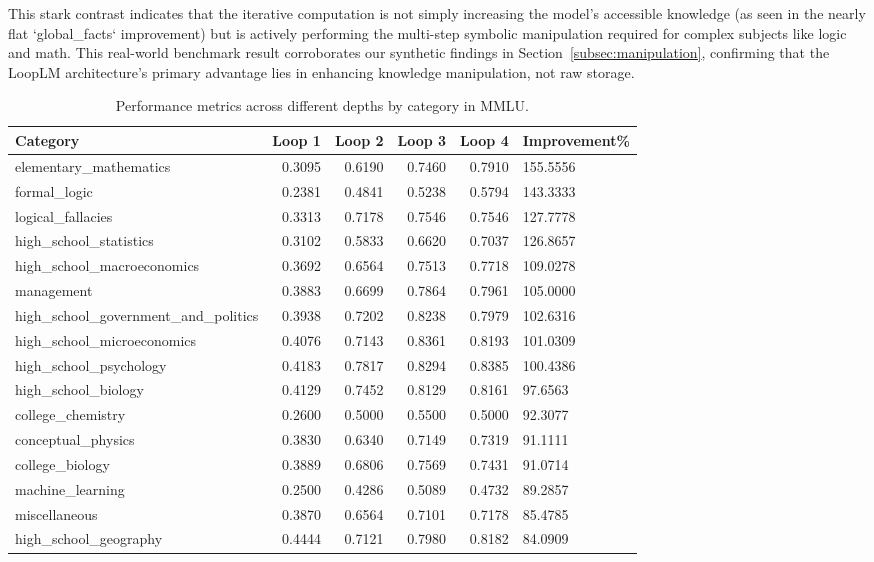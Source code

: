 \documentclass[]{bytedance_seed}
\newcommand{\1}{\mathbf{1}}
\newcommand{\ut}{LoopLM}
\begin{document}
{This stark contrast indicates that the iterative computation is not simply increasing the model's accessible knowledge (as seen in the nearly flat `global\_facts` improvement) but is actively performing the multi-step symbolic manipulation required for complex subjects like logic and math. This real-world benchmark result corroborates our synthetic findings in Section~\ref{subsec:manipulation}, confirming that the \ut{} architecture's primary advantage lies in enhancing knowledge manipulation, not raw storage.


\begin{table}[htbp]
\centering
\caption{Performance metrics across different depths by category in MMLU.}
\label{tab:performance_metrics}
\small
\begin{tabular}{lrrrrl}
\hline
Category & Loop 1 & Loop 2 & Loop 3 & Loop 4 & Improvement\% \\
\hline
elementary\_mathematics & 0.3095 & 0.6190 & 0.7460 & 0.7910 & 155.5556 \\
formal\_logic & 0.2381 & 0.4841 & 0.5238 & 0.5794 & 143.3333 \\
logical\_fallacies & 0.3313 & 0.7178 & 0.7546 & 0.7546 & 127.7778 \\
high\_school\_statistics & 0.3102 & 0.5833 & 0.6620 & 0.7037 & 126.8657 \\
high\_school\_macroeconomics & 0.3692 & 0.6564 & 0.7513 & 0.7718 & 109.0278 \\
management & 0.3883 & 0.6699 & 0.7864 & 0.7961 & 105.0000 \\
high\_school\_government\_and\_politics & 0.3938 & 0.7202 & 0.8238 & 0.7979 & 102.6316 \\
high\_school\_microeconomics & 0.4076 & 0.7143 & 0.8361 & 0.8193 & 101.0309 \\
high\_school\_psychology & 0.4183 & 0.7817 & 0.8294 & 0.8385 & 100.4386 \\
high\_school\_biology & 0.4129 & 0.7452 & 0.8129 & 0.8161 & 97.6563 \\
college\_chemistry & 0.2600 & 0.5000 & 0.5500 & 0.5000 & 92.3077 \\
conceptual\_physics & 0.3830 & 0.6340 & 0.7149 & 0.7319 & 91.1111 \\
college\_biology & 0.3889 & 0.6806 & 0.7569 & 0.7431 & 91.0714 \\
machine\_learning & 0.2500 & 0.4286 & 0.5089 & 0.4732 & 89.2857 \\
miscellaneous & 0.3870 & 0.6564 & 0.7101 & 0.7178 & 85.4785 \\
high\_school\_geography & 0.4444 & 0.7121 & 0.7980 & 0.8182 & 84.0909 \\

\end{tabular}
\end{table}}
\end{document}

